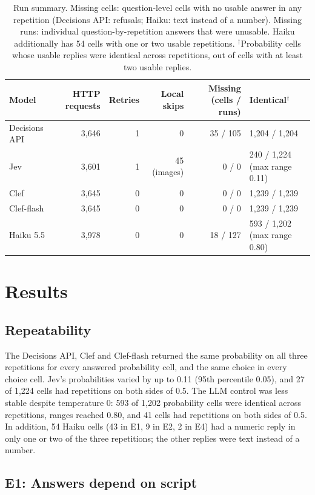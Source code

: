 \documentclass[11pt]{article}
\begin{document}
\begin{table}[t]
\centering
\footnotesize\setlength{\tabcolsep}{4pt}
\begin{tabular}{lrrrrl}
\toprule
Model & HTTP requests & Retries & Local skips & Missing (cells / runs) & Identical$^{\dagger}$ \\
\midrule
Decisions API & 3,646 & 1 & 0 & 35 / 105 & 1,204 / 1,204 \\
Jev & 3,601 & 1 & 45 (images) & 0 / 0 & 240 / 1,224 (max range 0.11) \\
Clef & 3,645 & 0 & 0 & 0 / 0 & 1,239 / 1,239 \\
Clef-flash & 3,645 & 0 & 0 & 0 / 0 & 1,239 / 1,239 \\
Haiku 5.5 & 3,978 & 0 & 0 & 18 / 127 & 593 / 1,202 (max range 0.80) \\
\bottomrule
\end{tabular}
\caption{Run summary. Missing cells: question-level cells with no usable answer in any repetition (Decisions API: refusals; Haiku: text instead of a number). Missing runs: individual question-by-repetition answers that were unusable. Haiku additionally has 54 cells with one or two usable repetitions. $^{\dagger}$Probability cells whose usable replies were identical across repetitions, out of cells with at least two usable replies.}
\label{tab:runs}
\end{table}

\section{Results}

\subsection{Repeatability}

The Decisions API, Clef and Clef-flash returned the same probability on all three repetitions for every answered probability cell, and the same choice in every choice cell. Jev's probabilities varied by up to 0.11 (95th percentile 0.05), and 27 of 1,224 cells had repetitions on both sides of 0.5. The LLM control was less stable despite temperature 0: 593 of 1,202 probability cells were identical across repetitions, ranges reached 0.80, and 41 cells had repetitions on both sides of 0.5. In addition, 54 Haiku cells (43 in E1, 9 in E2, 2 in E4) had a numeric reply in only one or two of the three repetitions; the other replies were text instead of a number.

\subsection{E1: Answers depend on script}
\end{document}
